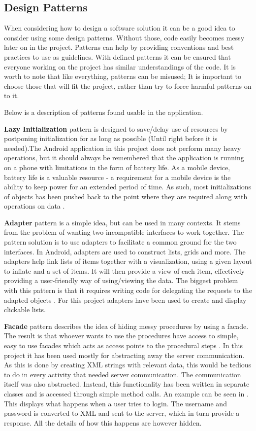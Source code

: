 \subsection{Design Patterns}\label{subsec:patterns}
When considering how to design a software solution it can be a good idea to consider using some design patterns. Without those, code easily becomes messy later on in the project. Patterns can help by providing conventions and best practices to use as guidelines. With defined patterns it can be ensured that everyone working on the project has similar understandings of the code. It is worth to note that like everything, patterns can be misused; It is important to choose those that will fit the project, rather than try to force harmful patterns on to it. 

Below is a description of patterns found usable in the application.

\textbf{Lazy Initialization} pattern is designed to save/delay use of resources by postponing initialization for as long as possible (Until right before it is needed).The Android application in this project does not perform many heavy operations, but it should always be remembered that the application is running on a phone with limitations in the form of battery life. As a mobile device, battery life is a valuable resource - a requirement for a mobile device is the ability to keep power for an extended period of time. As such, most initializations of objects has been pushed back to the point where they are required along with operations on data \cite{lazyInit}.

\textbf{Adapter} pattern is a simple idea, but can be used in many contexts. It stems from the problem of wanting two incompatible interfaces to work together. The pattern solution is to use adapters to facilitate a common ground for the two interfaces. In Android, adapters are used to construct lists, grids and more. The adapters help link lists of items together with a visualization, using a given layout to inflate and a set of items. It will then provide a view of each item, effectively providing a user-friendly way of using/viewing the data. The biggest problem with this pattern is that it requires writing code for delegating the requests to the adapted objects \cite{adappat}. For this project adapters have been used to create and display clickable lists.

\textbf{Facade} pattern describes the idea of hiding messy procedures by using a facade. The result is that whoever wants to use the procedures have access to simple, easy to use facades which acts as access points to the procedural steps \cite{facpat}. In this project it has been used mostly for abstracting away the server communication. As this is done by creating XML strings with relevant data, this would be tedious to do in every activity that needed server communication. The communication itself was also abstracted. Instead, this functionality has been written in separate classes and is accessed through simple method calls. An example can be seen in . This displays what happens when a user tries to login. The username and password is converted to XML and sent to the server, which in turn provide a response. All the details of how this happens are however hidden.

